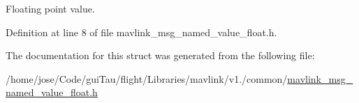 Floating point value. 



Definition at line 8 of file mavlink\-\_\-msg\-\_\-named\-\_\-value\-\_\-float.\-h.



The documentation for this struct was generated from the following file\-:\begin{DoxyCompactItemize}
\item 
/home/jose/\-Code/gui\-Tau/flight/\-Libraries/mavlink/v1./common/\hyperlink{mavlink__msg__named__value__float_8h}{mavlink\-\_\-msg\-\_\-named\-\_\-value\-\_\-float.\-h}\end{DoxyCompactItemize}
